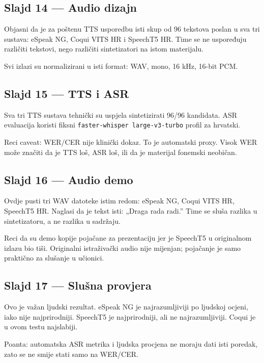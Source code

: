 \documentclass[
]{article}
\begin{document}
\subsection{Slajd 14 --- Audio dizajn}\label{slajd-14-audio-dizajn}

Objasni da je za poštenu TTS usporedbu isti skup od 96 tekstova poslan u
sva tri sustava: eSpeak NG, Coqui VITS HR i SpeechT5 HR. Time se ne
uspoređuju različiti tekstovi, nego različiti sintetizatori na istom
materijalu.

Svi izlazi su normalizirani u isti format: WAV, mono, 16 kHz, 16-bit
PCM.

\subsection{Slajd 15 --- TTS i ASR}\label{slajd-15-tts-i-asr}

Sva tri TTS sustava tehnički su uspjela sintetizirati 96/96 kandidata.
ASR evaluacija koristi fiksni \texttt{faster-whisper\ large-v3-turbo}
profil za hrvatski.

Reci caveat: WER/CER nije klinički dokaz. To je automatski proxy. Visok
WER može značiti da je TTS loš, ASR loš, ili da je materijal fonemski
neobičan.

\subsection{Slajd 16 --- Audio demo}\label{slajd-16-audio-demo}

Ovdje pusti tri WAV datoteke istim redom: eSpeak NG, Coqui VITS HR,
SpeechT5 HR. Naglasi da je tekst isti: „Draga rada radi.'' Time se sluša
razlika u sintetizatoru, a ne razlika u sadržaju.

Reci da su demo kopije pojačane za prezentaciju jer je SpeechT5 u
originalnom izlazu bio tiši. Originalni istraživački audio nije
mijenjan; pojačanje je samo praktično za slušanje u učionici.

\subsection{Slajd 17 --- Slušna
provjera}\label{slajd-17-sluux161na-provjera}

Ovo je važan ljudski rezultat. eSpeak NG je najrazumljiviji po ljudskoj
ocjeni, iako nije najprirodniji. SpeechT5 je najprirodniji, ali ne
najrazumljiviji. Coqui je u ovom testu najslabiji.

Poanta: automatska ASR metrika i ljudska procjena ne moraju dati isti
poredak, zato se ne smije stati samo na WER/CER.
\end{document}
